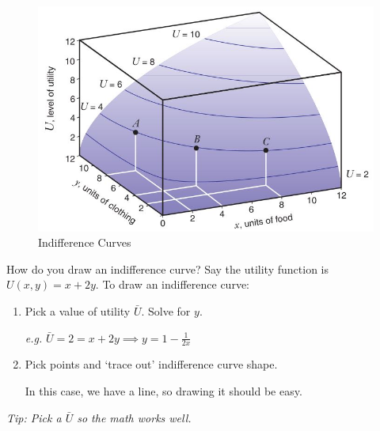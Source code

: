 \documentclass[12pt,t]{beamer}
\begin{document}

\begin{frame}
  \begin{figure}
    \caption{Indifference Curves}
    
    \includegraphics[width= 0.8\linewidth]{figures/fig3_4.jpg}
  \end{figure}
\end{frame}

\begin{frame}{How do you draw an indifference curve?}
  Say the utility function is $U(x, y) = x + 2y$. To draw an indifference curve:

  \bigskip
  \begin{enumerate}
    \item Pick a value of utility $\bar{U}$. Solve for $y$.
    
    \emph{e.g.} $\bar{U} = 2 = x + 2y \implies y = 1 - \frac{1}{2x}$

    \item Pick points and `trace out' indifference curve shape. 
    
    In this case, we have a line, so drawing it should be easy.
  \end{enumerate}

  \bigskip
  \begin{center}
    \emph{Tip: Pick a $\bar{U}$ so the math works well.}
  \end{center}
\end{frame}
\end{document}
